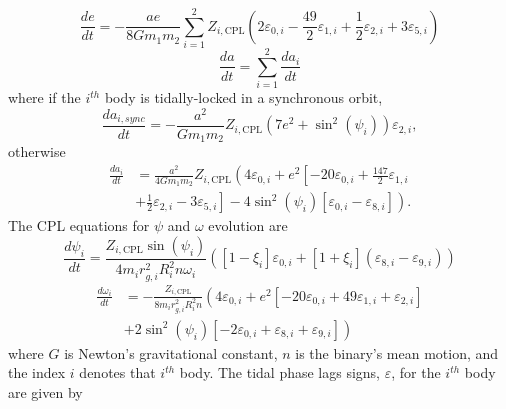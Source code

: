 \documentclass[twocolumn]{aastex61}
\begin{document}
\begin{equation} \label{eqn:cpl_e}
\frac{de}{dt} = -\frac{ae}{8 G m_1 m_2} \sum_{i=1}^2 Z_{i,\mathrm{CPL}} \left( 2 \varepsilon_{0,i} - \frac{49}{2} \varepsilon_{1,i} + \frac{1}{2} \varepsilon_{2,i} + 3 \varepsilon_{5,i} \right)
\end{equation}
\begin{equation} \label{eqn:cpl_a}
\frac{da}{dt} = \sum_{i=1}^2 \frac{da_i}{dt}
\end{equation}
where if the $i^{th}$ body is tidally-locked in a synchronous orbit,
\begin{equation} \label{eqn:cpl_dadt_locked}
\frac{da_{i,sync}}{dt} = -\frac{a^2}{G m_1 m_2} Z_{i,\mathrm{CPL}} \left( 7 e^2 + \sin^2 (\psi_i) \right) \varepsilon_{2,i},
\end{equation}
otherwise
\begin{equation}
\begin{split}
\frac{da_i}{dt} & = \frac{a^2}{4 G m_1 m_2} Z_{i,\mathrm{CPL}} \left( 4 \varepsilon_{0,i} + e^2 \left[ -20 \varepsilon_{0,i} + \frac{147}{2} \varepsilon_{1,i} \right. \right. \\
&  + \left. \left. \frac{1}{2} \varepsilon_{2,i} - 3 \varepsilon_{5,i} \right] - 4 \sin^2 (\psi_i) \left[ \varepsilon_{0,i} - \varepsilon_{8,i} \right] \right).
\end{split}
\end{equation}
The CPL equations for $\psi$ and $\omega$ evolution are
\begin{equation} \label{eqn:cpl_psi}
\frac{d\psi_i}{dt} = \frac{Z_{i,\mathrm{CPL}} \sin(\psi_i)}{4 m_i r_{g,i}^2 R_i^2 n \omega_i} \left( [1-\xi_i] \varepsilon_{0,i} + [1+\xi_i](\varepsilon_{8,i} - \varepsilon_{9,i}) \right)
\end{equation}
\begin{equation} \label{eqn:cpl_omega}
\begin{split}
\frac{d\omega_i}{dt}& = -\frac{Z_{i,\mathrm{CPL}}}{8m_i r_{g,i}^2 R_i^2 n} \left(4 \varepsilon_{0,i} + e^2\left[-20\varepsilon_{0,i} + 49\varepsilon_{1,i} + \varepsilon_{2,i} \right] \right. \\
& \left. + 2 \sin^2(\psi_i) \left[ -2 \varepsilon_{0,i} + \varepsilon_{8,i} + \varepsilon_{9,i} \right] \right)
\end{split}
\end{equation}
where $G$ is Newton's gravitational constant, $n$ is the binary's mean motion, and the index $i$ denotes that $i^{th}$ body. The tidal phase lags signs, $\varepsilon$, for the $i^{th}$ body are given by
\end{document}
